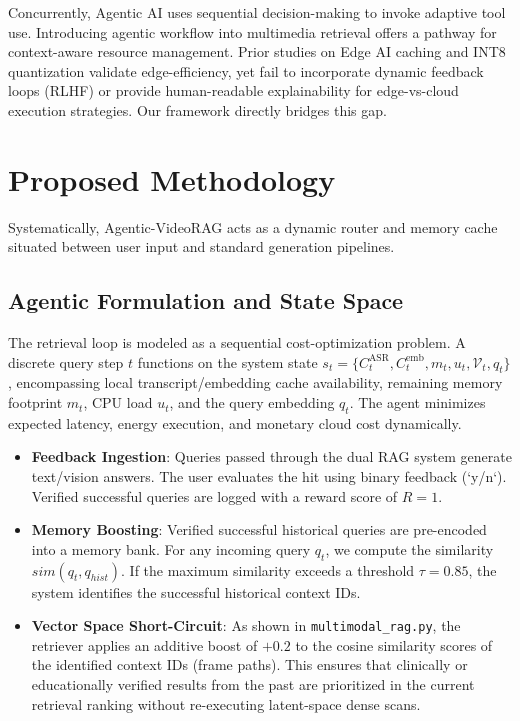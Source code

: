 \documentclass[preprint,12pt]{elsarticle}
\begin{document}
Concurrently, Agentic AI \citep{yao2023react} uses sequential decision-making to invoke adaptive tool use. Introducing agentic workflow into multimedia retrieval offers a pathway for context-aware resource management. Prior studies on Edge AI caching \citep{tan2022edgecache} and INT8 quantization \citep{xu2020quant} validate edge-efficiency, yet fail to incorporate dynamic feedback loops (RLHF) or provide human-readable explainability for edge-vs-cloud execution strategies. Our framework directly bridges this gap.

\section{Proposed Methodology}
Systematically, Agentic-VideoRAG acts as a dynamic router and memory cache situated between user input and standard generation pipelines.

\subsection{Agentic Formulation and State Space}
The retrieval loop is modeled as a sequential cost-optimization problem. A discrete query step $t$ functions on the system state $s_t = \{ C^{\text{ASR}}_t, C^{\text{emb}}_t, m_t, u_t, \mathcal{V}_t, q_t \}$, encompassing local transcript/embedding cache availability, remaining memory footprint $m_t$, CPU load $u_t$, and the query embedding $q_t$. The agent minimizes expected latency, energy execution, and monetary cloud cost dynamically.

\begin{itemize}
    \item \textbf{Feedback Ingestion}: Queries passed through the dual RAG system generate text/vision answers. The user evaluates the hit using binary feedback (`y/n`). Verified successful queries are logged with a reward score of $R=1$.
    \item \textbf{Memory Boosting}: Verified successful historical queries are pre-encoded into a memory bank. For any incoming query $q_t$, we compute the similarity $sim(q_t, q_{hist})$. If the maximum similarity exceeds a threshold $\tau = 0.85$, the system identifies the successful historical context IDs.
    \item \textbf{Vector Space Short-Circuit}: As shown in \texttt{multimodal\_rag.py}, the retriever applies an additive boost of $+0.2$ to the cosine similarity scores of the identified context IDs (frame paths). This ensures that clinically or educationally verified results from the past are prioritized in the current retrieval ranking without re-executing latent-space dense scans.
\end{itemize}
\end{document}
